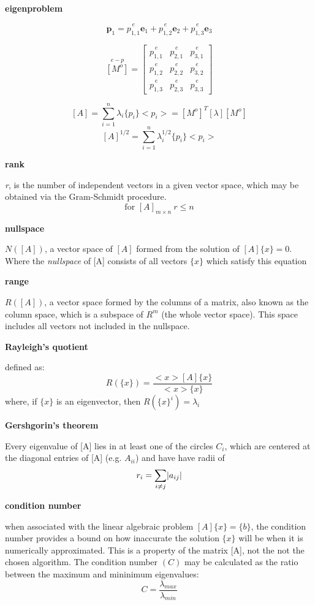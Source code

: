 \documentclass[letterpaper, 10pt, oneside]{article}
\newenvironment{dd}[1]{
	\noindent
	\textbf{\normalsize{#1}}
	\hspace{0.1in}
	\small
	\rmfamily
	}
	{\medskip}
\newcommand{\be}{\begin{equation}}
\newcommand{\ee}{\end{equation}}
\newcommand{\bdd}{\begin{dd}}
\newcommand{\edd}{\end{dd}}
\DeclarePairedDelimiter\abs{\lvert}{\rvert}%
\begin{document}
\begin{dd}{eigenproblem}
\be \bm{p}_1 = \overset{e}{p_{1,1}} \bm{e}_1 + \overset{e}{p_{1,2}} \bm{e}_2 + \overset{e}{p_{1,3}} \bm{e}_3 \ee

\be \label{Modal} \overset{e-p}{[M^o]} = \begin{bmatrix}  \overset{e}{p_{1,1}} &  \overset{e}{p_{2,1}}  &  \overset{e}{p_{3,1}} \\ \overset{e}{p_{1,2}} &  \overset{e}{p_{2,2}}  &  \overset{e}{p_{3,2}} \\ \overset{e}{p_{1,3}} &  \overset{e}{p_{2,3}}  &  \overset{e}{p_{3,3}} \end{bmatrix} \ee

\be \label{specDecomp} [A] = \sum_{i=1}^{n} \lambda_i \{p_i\}<p_i> = [M^o]^T [\lambda] [M^o]\ee
\be \label{func} [A]^{1/2} = \sum_{i=1}^{n} \lambda_i^{1/2} \{p_i\}<p_i> \ee

\end{dd}

\bdd{rank}
\emph{r}, is the number of independent vectors in a given vector space, which may be obtained via the Gram-Schmidt procedure. $$\text{for } [A]_{m \times n} \ r \le n$$
\edd

\bdd{nullspace}
$N([A])$, a vector space of $[A]$ formed from the solution of $[A]\{x\} = 0$. Where the \emph{nullspace} of [A] consists of all vectors $\{x\}$ which satisfy this equation
\edd

\bdd{range}
$R([A])$, a vector space formed by the columns of a matrix, also known as the column space, which is a subspace of $R^m$ (the whole vector space). This space includes all vectors not included in the nullspace.
\edd

\bdd{Rayleigh's quotient}
defined as: $$R(\{x\}) = \frac{<x>[A]\{x\}}{<x>\{x\}}$$
where, if $\{x\}$ is an eigenvector, then $R(\{x\}^i) = \lambda_i$
\edd

\bdd{Gershgorin's theorem}
Every eigenvalue of [A] lies in at least one of the circles $C_i$, which are centered at the diagonal entries of [A] (e.g. $A_{ii}$) and have have radii of $$r_i = \sum_{i \ne j} \abs{a_{ij}}$$
\edd

\bdd{condition number}
when associated with the linear algebraic problem $[A]\{x\}=\{b\}$, the condition number provides a bound on how inaccurate the solution $\{x\}$ will be when it is numerically approximated.  This is a property of the matrix [A], not the not the chosen algorithm.  The condition number $(C)$ may be calculated as the ratio between the maximum and mininimum eigenvalues: $$C = \frac{\lambda_{max}}{\lambda_{min}}$$
\edd
\end{document}
